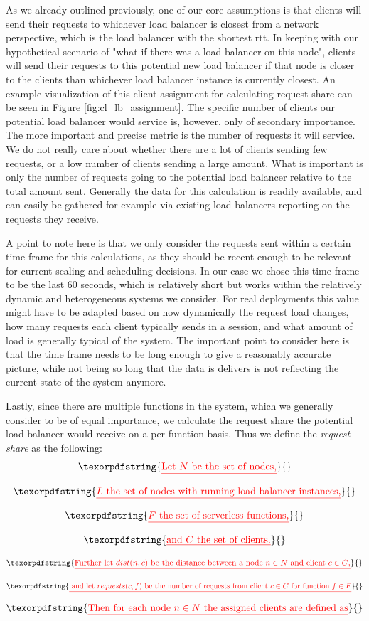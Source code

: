 \documentclass[draft,final]{vutinfth} %
\providecommand{\DIFdeltex}[1]{{\protect\color{red}\sout{#1}}}                      %
\providecommand{\DIFaddbegin}{} %
\providecommand{\DIFdelbegin}{} %
\providecommand{\DIFdelend}{} %
\providecommand{\DIFdel}[1]{\texorpdfstring{\DIFdeltex{#1}}{}} %
\begin{document}
As we already outlined previously, one of our core assumptions is that clients will send their requests to whichever load balancer is closest from a network perspective, which is the load balancer with the shortest \gls{rtt}.
In keeping with our hypothetical scenario of "what if there was a load balancer on this node", clients will send their requests to this potential new load balancer if that node is closer to the clients than whichever load balancer instance is currently closest.
An example visualization of this client assignment for calculating request share can be seen in Figure \ref{fig:cl_lb_assignment}.
The specific number of clients our potential load balancer would service is, however, only of secondary importance. The more important and precise metric is the number of requests it will service.
We do not really care about whether there are a lot of clients sending few requests, or a low number of clients sending a large amount. What is important is only the number of requests going to the potential load balancer relative to the total amount sent.
Generally the data for this calculation is readily available, and can easily be gathered for example via existing load balancers reporting on the requests they receive.

A point to note here is that we only consider the requests sent within a certain time frame for this calculations, as they should be recent enough to be relevant for current scaling and scheduling decisions.
In our case we chose this time frame to be the last 60 seconds, which is relatively short but works within the relatively dynamic and heterogeneous systems we consider.
For real deployments this value might have to be adapted based on how dynamically the request load changes, how many requests each client typically sends in a session, and what amount of load is generally typical of the system.
The important point to consider here is that the time frame needs to be long enough to give a reasonably accurate picture, while not being so long that the data is delivers is not reflecting the current state of the system anymore.

Lastly, since there are multiple functions in the system, which we generally consider to be of equal importance, we calculate the request share the potential load balancer would receive on a per-function basis.
Thus we define the \textit{request share} as the following:
\DIFdelbegin \[ \DIFdel{\text{Let }N\text{ be the set of nodes,} }\]%
\[ \DIFdel{L\text{ the set of nodes with running load balancer instances,} }\]%
\[ \DIFdel{F\text{ the set of serverless functions,} }\]%
\[ \DIFdel{\text{and }C\text{ the set of clients.} }\]%
\[ \DIFdel{\text{Further let } dist(n,c) \text{ be the distance between a node } n \in N \text{ and client }c \in C\text{,}}\]%
\[ \DIFdel{\text{ and let }requests(c, f) \text{ be the number of requests from client }c \in C \text{ for function }f \in F}\]%
\[ \DIFdel{\text{Then for each node }n \in N\text{ the assigned clients are defined as} }\]%
\DIFdelend \DIFaddbegin 
\end{document}
